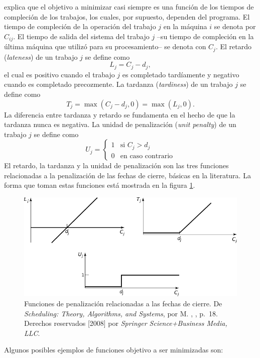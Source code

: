 \documentclass[spanish,draft,12pt,headsepline,footsepline,paper=letter]{scrreprt}
\begin{document}
\citet[p.~18]{Pinedo1995} explica que el objetivo a minimizar casi siempre es una función de los tiempos de compleción de los trabajos, los cuales, por supuesto, dependen del programa. 
El tiempo de compleción de la operación del trabajo $j$ en la máquina $i$ se denota por $C_{ij}$. El tiempo de salida del sistema del trabajo $j$ –su tiempo de compleción en la última máquina que utilizó para su procesamiento– se denota con $C_j$.
%
El retardo (\textit{lateness}) de un trabajo $j$ se define como 
\[ L_j = C_j - d_j, \]
el cual es positivo cuando el trabajo $j$ es completado tardíamente y negativo cuando es completado precozmente. La tardanza (\textit{tardiness}) de un trabajo $j$ se define como
\[ T_j = \max(C_j - d_j, 0) = \max(L_j, 0). \]
La diferencia entre tardanza y retardo se fundamenta en el hecho de que la tardanza nunca es negativa. La unidad de penalización (\textit{unit penalty}) de un trabajo $j$ se define como
\[ U_j = \left\{
    \begin{array}{ll}
      1 & \mbox{si } C_j > d_j \\
      0 & \mbox{en caso contrario}
    \end{array}
  \right. \]
El retardo, la tardanza y la unidad de penalización son las tres funciones relacionadas a la penalización de las fechas de cierre, básicas en la literatura. La forma que toman estas funciones está mostrada en la figura \ref{fig:penalty_fun}.

\begin{figure}[hbtp]
\centering
\includegraphics[width=.8\textwidth]{media/penalty_functions.pdf}
\caption[Funciones de penalización]{Funciones de penalización relacionadas a las fechas de cierre. De \textit{Scheduling: Theory, Algorithms, and Systems}, por M. \citeauthor{Pinedo1995}, \citeyear{Pinedo1995}, p.~18. Derechos reservados [2008] por \textit{Springer Science+Business Media, LLC}.}
\label{fig:penalty_fun}
\end{figure}

Algunos posibles ejemplos de funciones objetivo a ser minimizadas son:
\end{document}
